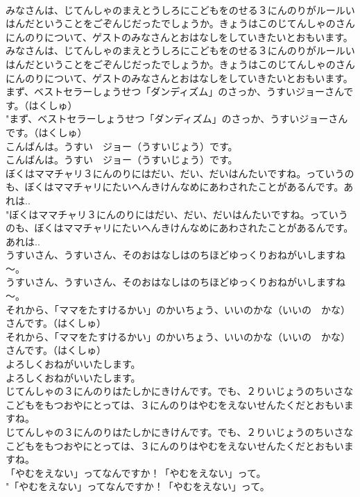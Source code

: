 \documentclass[8pt]{extreport}
\begin{document}
\begin{CJK}{UTF8}{min}
\\	みなさんは、じてんしゃのまえとうしろにこどもをのせる３にんのりがルールいはんだということをごぞんじだったでしょうか。きょうはこのじてんしゃのさんにんのりについて、ゲストのみなさんとおはなしをしていきたいとおもいます。	
\\	みなさんは、じてんしゃのまえとうしろにこどもをのせる３にんのりがルールいはんだということをごぞんじだったでしょうか。きょうはこのじてんしゃのさんにんのりについて、ゲストのみなさんとおはなしをしていきたいとおもいます。 
\\	まず、ベストセラーしょうせつ「ダンディズム」のさっか、うすいジョーさんです。（はくしゅ）	
\\	"まず、ベストセラーしょうせつ「ダンディズム」のさっか、うすいジョーさんです。（はくしゅ） 
\\	こんばんは。うすい　ジョー（うすいじょう）です。	
\\	こんばんは。うすい　ジョー（うすいじょう）です。 
\\	ぼくはママチャリ３にんのりにはだい、だい、だいはんたいですね。っていうのも、ぼくはママチャリにたいへんきけんなめにあわされたことがあるんです。あれは..	
\\	"ぼくはママチャリ３にんのりにはだい、だい、だいはんたいですね。っていうのも、ぼくはママチャリにたいへんきけんなめにあわされたことがあるんです。あれは.. 
\\	うすいさん、うすいさん、そのおはなしはのちほどゆっくりおねがいしますね～。	
\\	うすいさん、うすいさん、そのおはなしはのちほどゆっくりおねがいしますね～。 
\\	それから、「ママをたすけるかい」のかいちょう、いいのかな（いいの　かな）さんです。（はくしゅ）	
\\	それから、「ママをたすけるかい」のかいちょう、いいのかな（いいの　かな）さんです。（はくしゅ） 
\\	よろしくおねがいいたします。	
\\	よろしくおねがいいたします。 
\\	じてんしゃの３にんのりはたしかにきけんです。でも、２りいじょうのちいさなこどもをもつおやにとっては、３にんのりはやむをえないせんたくだとおもいますね。	
\\	じてんしゃの３にんのりはたしかにきけんです。でも、２りいじょうのちいさなこどもをもつおやにとっては、３にんのりはやむをえないせんたくだとおもいますね。 
\\	「やむをえない」ってなんですか！「やむをえない」って。	
\\	"「やむをえない」ってなんですか！「やむをえない」って。 

\end{CJK}
\end{document}
